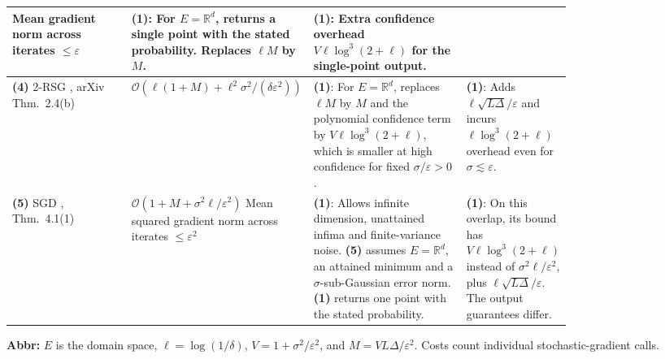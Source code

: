 \begin{table}[tp]
\begin{threeparttable}
\begin{tabularx}{\linewidth}{@{}>{\raggedright\arraybackslash}p{0.22\linewidth}>{\raggedright\arraybackslash}p{0.30\linewidth}>{\raggedright\arraybackslash}p{0.28\linewidth}>{\raggedright\arraybackslash}X@{}}
Mean gradient norm across iterates $\le\varepsilon$
& \textbf{(1)}: For $E=\mathbb R^d$, returns a single point with the stated probability. Replaces $\ell M$ by $M$.
& \textbf{(1)}: Extra confidence overhead $V\ell\log^3(2+\ell)$ for the single-point output. \\
\midrule
\textbf{(4)} 2-RSG \citep{hpsGhadimiLan2013}, arXiv Thm.~2.4(b)
& $\mathcal{O}(\ell(1+M)+\ell^2\sigma^2/(\delta\varepsilon^2))$
& \textbf{(1)}: For $E=\mathbb R^d$, replaces $\ell M$ by $M$ and the polynomial confidence term by $V\ell\log^3(2+\ell)$, which is smaller at high confidence for fixed $\sigma/\varepsilon>0$.
& \textbf{(1)}: Adds $\ell\sqrt{L\Delta}/\varepsilon$ and incurs $\ell\log^3(2+\ell)$ overhead even for $\sigma\lesssim\varepsilon$. \\
\midrule
\textbf{(5)} SGD \citep{hpsLiuEtAl2023}, Thm.~4.1(1)
& $\mathcal{O}(1+M+\sigma^2\ell/\varepsilon^2)$\newline
Mean squared gradient norm across iterates $\le\varepsilon^2$
& \textbf{(1)}: Allows infinite dimension, unattained infima and finite-variance noise. \textbf{(5)} assumes $E=\mathbb R^d$, an attained minimum and a $\sigma$-sub-Gaussian error norm. \textbf{(1)} returns one point with the stated probability.
& \textbf{(1)}: On this overlap, its bound has $V\ell\log^3(2+\ell)$ instead of $\sigma^2\ell/\varepsilon^2$, plus $\ell\sqrt{L\Delta}/\varepsilon$. The output guarantees differ. \\
\bottomrule
\end{tabularx}
\begin{tablenotes}[flushleft]\footnotesize
\item[] \textbf{Abbr:} $E$ is the domain space, $\ell=\log(1/\delta)$, $V=1+\sigma^2/\varepsilon^2$, and $M=VL\Delta/\varepsilon^2$. Costs count individual stochastic-gradient calls.
\end{tablenotes}
\end{threeparttable}
\end{table}

